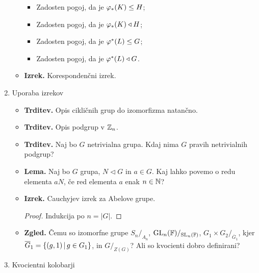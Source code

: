 \begin{enumerate}
\begin{itemize}
        \begin{itemize}
            \item Zadosten pogoj, da je \(\varphi_{*}(K) \leq H\);
            \item Zadosten pogoj, da je \(\varphi_{*}(K) \triangleleft H\);
            \item Zadosten pogoj, da je \(\varphi^{*}(L) \leq G\);
            \item Zadosten pogoj, da je \(\varphi^{*}(L) \triangleleft G\).
        \end{itemize}
        \item \textbf{Izrek.} Korespondenčni izrek.
    \end{itemize}

    \item Uporaba izrekov
    \begin{itemize}
        \item \textbf{Trditev.} Opis cikličnih grup do izomorfizma natančno.
        \item \textbf{Trditev.} Opis podgrup v \(\mathbb{Z}_n\).
        \item \textbf{Trditev.} Naj bo \(G\) netrivialna grupa. Kdaj nima \(G\) pravih netrivialnih podgrup?
        \item \textbf{Lema.} Naj bo \(G\) grupa, \(N \triangleleft G\) in \(a \in G\). Kaj lahko povemo o redu elementa \(aN\), če red elementa \(a\) enak \(n \in \mathbb{N}\)?
        \item \textbf{Izrek.} Cauchyjev izrek za Abelove grupe. \todo{*}
        \begin{proof}
            Indukcija po \(n = |G|\).
        \end{proof}
        \item \textbf{Zgled.} Čemu so izomorfne grupe \(S_n/_{A_n}\), \(\operatorname{GL}_n(\mathbb{F})/_{\operatorname{SL}_n(\mathbb{F})}\), \(G_1 \times G_2/_{\overline{G}_1}\), kjer \(\overline{G}_1 = \{(g, 1) \,|\, g \in G_1\}\), in \(G/_{Z(G)}\)? Ali so kvocienti dobro definirani?
    \end{itemize}

    \newpage
    \item Kvocientni kolobarji
    

\end{enumerate}
